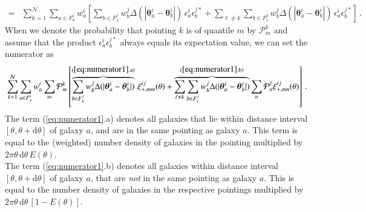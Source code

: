 \documentclass{aa}
\renewcommand{\rm}{\mathrm}
\def\b#1{\bm{#1}}
\begin{document}
\begin{appendix}
\begin{align}
  = & \sum_{k=1}^\mathcal{N}\sum_{a\in F_k^i}w_a^i \left[\sum_{b\in F_{k}^j} w_b^j \Delta(|\b\theta_a^i-\b\theta_b^i|)\, \epsilon_a^i\epsilon_b^{j*} + \sum_{\ell\neq k} \sum_{b\in F_{\ell}^j} w_b^j \Delta(|\b\theta_a^i-\b\theta_b^i|)\, \epsilon_a^i\epsilon_b^{j*}\right] \, .
\end{align}
When we denote the probability that pointing $k$ is of quantile $m$ by $\mathcal{P}_m^k$ and assume that the product $\epsilon_a^i\epsilon_b^{j*}$ always equals its expectation value, we can set the numerator as \begin{equation}
\sum_{k=1}^\mathcal{N}\sum_{a\in F_k^i}w_a^i \sum_m \mathcal{P}_m^k \left[\overbrace{\sum_{b\in F_{k}^j} w_b^j \Delta(|\b\theta_a^i-\b\theta_b^i|)}^{\rm{(\ref{eq:numerator1}.a)}}\,  \xi_{+,mm}^{ij}(\theta) + \overbrace{\sum_{\ell\neq k} \sum_{b\in F_{\ell}^j} w_b^j \Delta(|\b\theta_a^i-\b\theta_b^i|)}^{\rm{(\ref{eq:numerator1}.b)}} \sum_n \mathcal{P}_n^{\ell} \xi_{+,mn}^{ij}(\theta)\right] \, .
\label{eq:numerator1}
\end{equation}
The term (\ref{eq:numerator1}.a) denotes all galaxies that lie within distance interval $[\theta,\theta+{\rm d}\theta]$ of galaxy $a$, and are in the same pointing as galaxy $a$. This term is equal to the (weighted) number density of galaxies in the pointing multiplied by $2\pi\theta\, {\rm d}\theta\, E(\theta)$. \\
The term (\ref{eq:numerator1}.b) denotes all galaxies within distance interval $[\theta,\theta+{\rm d}\theta]$ of galaxy $a$, that are \textit{not} in the same pointing as galaxy $a$. This is equal to the number density of galaxies in the respective pointings multiplied by $2\pi\theta\, {\rm d}\theta\, [1-E(\theta)]$. 
 

\end{appendix}
\end{document}
